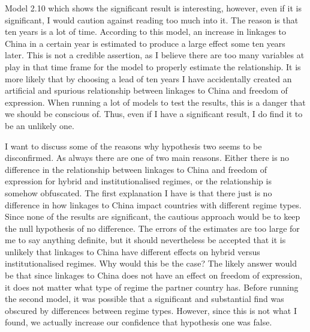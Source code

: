 Model 2.10 which shows the significant result is interesting, however, even if it is significant, I would caution against reading too much into it. The reason is that ten years is a lot of time. According to this model, an increase in linkages to China in a certain year is estimated to produce a large effect some ten years later. This is not a credible assertion, as I believe there are too many variables at play in that time frame for the model to properly estimate the relationship. It is more likely that by choosing a lead of ten years I have accidentally created an artificial and spurious relationship between linkages to China and freedom of expression. When running a lot of models to test the results, this is a danger that we should be conscious of. Thus, even if I have a significant result, I do find it to be an unlikely one. 

I want to discuss some of the reasons why hypothesis two seems to be disconfirmed. As always there are one of two main reasons.  Either there is no difference in the relationship between linkages to China and freedom of expression for hybrid  and institutionalised regimes, or the relationship is somehow obfuscated. The first explanation I have is that there just is no difference in how linkages to China impact countries with different regime types. Since none of the results are significant, the cautious approach would be to keep the null hypothesis of no difference. The errors of the estimates are too large for me to say anything definite, but it should nevertheless be accepted that it is unlikely that linkages to China have different effects on hybrid versus institutionalised regimes. Why would this be the case? The likely answer would be that since linkages to China does not have an effect on freedom of expression, it does not matter what type of regime the partner country has. Before running the second model, it was possible that a significant and substantial find was obscured by differences between regime types. However, since this is not what I found, we actually increase our confidence that hypothesis one was false.

